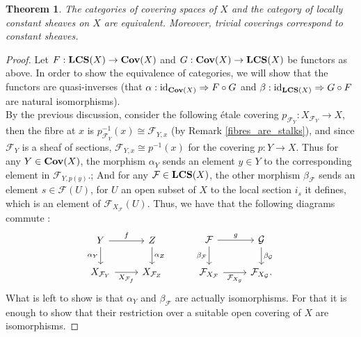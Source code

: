 \documentclass{article}
\theoremstyle{plain}
\newtheorem{theorem}{Theorem}[subsection]
\theoremstyle{definition}
\DeclareMathOperator{\id}{id}
\DeclareMathOperator{\Cov}{\bf{Cov}}
\DeclareMathOperator{\LCS}{\bf{LCS}}
\begin{document}
\begin{theorem}
\label{LCS_equiv_Cov}
    The categories of covering spaces of $X$ and the category of locally constant sheaves on $X$ are equivalent. 
    Moreover, trivial coverings correspond to constant sheaves.
\end{theorem}
\begin{proof}
    Let $F: \LCS(X) \rightarrow \Cov(X)$ and $G:\Cov(X)\rightarrow\LCS(X)$ be functors as above.
    In order to show the equivalence of categories, we will show that the functors are quasi-inverses (that $\alpha:\id_{\Cov(X)} \Rightarrow F\circ G$ and $\beta:\id_{\LCS(X)}\Rightarrow G\circ F$ are natural isomorphisms). \\
    By the previous discussion, consider the following \'etale covering
    $p_{\mathcal{F}_Y}:X_{\mathcal{F}_Y}\rightarrow X$, then the fibre at $x$ is $p_{\mathcal{F}_Y}^{-1}(x) \cong \mathcal{F}_{Y,x}$ (by Remark \ref{fibres_are_stalks}), and since $\mathcal{F}_Y$ is a sheaf of sections, $\mathcal{F}_{Y,x} \cong p^{-1}(x)$ for the covering $p:Y\rightarrow X$.
    Thus for any $Y\in\Cov(X)$, the morphism $\alpha_Y$ sends an element $y\in Y$ to the corresponding element in $\mathcal{F}_{Y,p(y)}$.;                                                                                              
    And for any $\mathcal{F}\in \LCS(X)$, the other morphism $\beta_{\mathcal{F}}$ sends an element $s\in\mathcal{F}(U)$, for $U$ an open subset of $X$ to the local section $i_s$ it defines, which is an element of $\mathcal{F}_{X_{\mathcal{F}}}(U)$.
    Thus, we have that the following diagrams commute :
    \[
    \begin{tikzcd}
        Y \arrow[r,"f"] \arrow[d, "\alpha_Y"']
        & Z \arrow[d,"\alpha_{Z}"] \\
        X_{\mathcal{F}_{Y}} \arrow[r,"X_{\mathcal{F}_f}"']
        &  X_{\mathcal{F}_{Z}}
    \end{tikzcd}
    \hspace{1cm}
    \begin{tikzcd}
        \mathcal{F} \arrow[r,"g"] \arrow[d, "\beta_{\mathcal{F}}"']
        & \mathcal{G} \arrow[d,"\beta_{\mathcal{G}}"] \\
        \mathcal{F}_{X_{\mathcal{F}}} \arrow[r,"\mathcal{F}_{X_{g}}"']
        &  \mathcal{F}_{X_{\mathcal{G}}}.
    \end{tikzcd}
    \]
    What is left to show is that $\alpha_Y$ and $\beta_{\mathcal{F}}$ are actually isomorphisms. For that it is enough to show that their restriction over a suitable open covering of $X$ are isomorphisms.

\end{proof}
\end{document}
